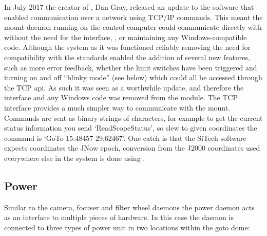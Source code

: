\begin{colsection}
\begin{colsection}
In July 2017 the creator of , Dan Gray, released an update to the software that enabled communication over a network using TCP/IP commands. This meant the mount daemon running on the control computer could communicate directly with  without the need for the interface, ,  or maintaining any Windows-compatible code. Although the system as it was functioned reliably removing the need for compatibility with the  standards enabled the addition of several new features, such as more error feedback, whether the limit switches have been triggered and turning on and off ``blinky mode'' (see below) which could all be accessed through the TCP \gls{api}. As such it was seen as a worthwhile update, and therefore the  interface and any Windows code was removed from the  module. The TCP interface provides a much simpler way to communicate with the mount. Commands are sent as binary strings of characters, for example to get the current status information you send `ReadScopeStatus', so slew to given coordinates the command is `GoTo 15.48457 29.62467'. One catch is that the SiTech software expects coordinates the JNow epoch, conversion from the J2000 coordinates used everywhere else in the system is done using .

\end{colsection}


\subsection{Power}
\label{sec:power}
\begin{colsection}

Similar to the camera, focuser and filter wheel daemons the power daemon acts as an interface to multiple pieces of hardware. In this case the daemon is connected to three types of power unit in two locations within the \gls{goto} dome:


\end{colsection}
\end{colsection}
